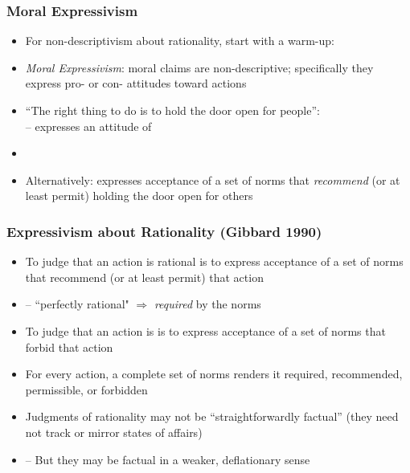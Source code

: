 \begin{frame}
\frametitle{Moral Expressivism}

\begin{itemize}[<+->]

\item For non-descriptivism about rationality, start with a warm-up:%

\item \emph{Moral Expressivism}: moral claims are non-descriptive; specifically they express pro- or con- attitudes toward actions

\item ``The right thing to do is to hold the door open for people'': \\ -- expresses an attitude of
\item[] 

\item Alternatively: expresses acceptance of a set of norms that \textit{recommend} (or at least permit) holding the door open for others

\end{itemize}
\end{frame}

\begin{frame}
\frametitle{Expressivism about Rationality (Gibbard 1990)}

\begin{itemize}[<+->]

\item To judge that an action is rational is to express acceptance of a set of norms that recommend (or at least permit) that action

\item[] -- ``\textcolor{highlightA}{perfectly rational}" $\Rightarrow$ \emph{required} by the norms

\item To judge that an action is  is to express acceptance of a set of norms that \textcolor{OGlyallpink}{forbid} that action

\item For every action, a complete set of norms renders it required, recommended, permissible, or forbidden 

\item Judgments of rationality may not be ``straightforwardly factual'' (they need not track or mirror states of affairs)
\item[] -- But they may be factual in a weaker, deflationary sense 


\end{itemize}
\end{frame}

